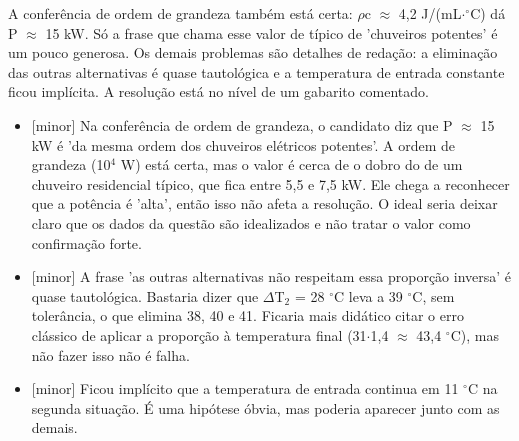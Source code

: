 \documentclass{article}%
\begin{document}
A conferência de ordem de grandeza também está certa: $\rho$c $\approx$ 4,2 J/(mL$\cdot$$^\circ$C) dá P $\approx$ 15 kW. Só a frase que chama esse valor de típico de 'chuveiros potentes' é um pouco generosa. Os demais problemas são detalhes de redação: a eliminação das outras alternativas é quase tautológica e a temperatura de entrada constante ficou implícita. A resolução está no nível de um gabarito comentado.%
\begin{itemize}%
\item%
{[}minor{]} Na conferência de ordem de grandeza, o candidato diz que P $\approx$ 15 kW é 'da mesma ordem dos chuveiros elétricos potentes'. A ordem de grandeza (10$^{4}$ W) está certa, mas o valor é cerca de o dobro do de um chuveiro residencial típico, que fica entre 5,5 e 7,5 kW. Ele chega a reconhecer que a potência é 'alta', então isso não afeta a resolução. O ideal seria deixar claro que os dados da questão são idealizados e não tratar o valor como confirmação forte.%
\item%
{[}minor{]} A frase 'as outras alternativas não respeitam essa proporção inversa' é quase tautológica. Bastaria dizer que $\Delta$T$_{2}$ = 28 $^\circ$C leva a 39 $^\circ$C, sem tolerância, o que elimina 38, 40 e 41. Ficaria mais didático citar o erro clássico de aplicar a proporção à temperatura final (31$\cdot$1,4 $\approx$ 43,4 $^\circ$C), mas não fazer isso não é falha.%
\item%
{[}minor{]} Ficou implícito que a temperatura de entrada continua em 11 $^\circ$C na segunda situação. É uma hipótese óbvia, mas poderia aparecer junto com as demais.%
\end{itemize}%
\end{document}
